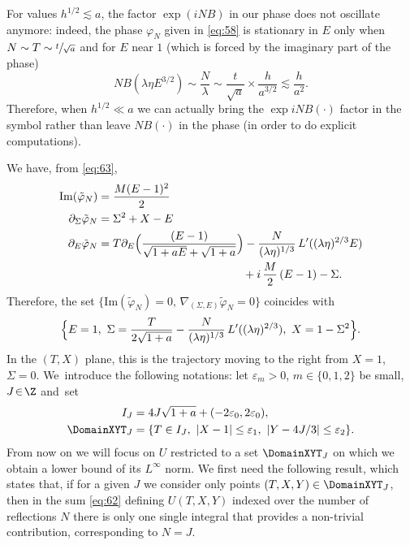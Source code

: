 \begin{rmq}\label{rmqBNB}
For values $h^{1/2}\lesssim a$, the factor $\exp{(iNB)}$ in our phase does not oscillate anymore: indeed, the phase $\varphi_N$ given in \eqref{eq:58} is stationary in $E$ only when $N\sim T\sim \sfrac{t}{\sqrt{a}}$ and for $E$ near $1$ (which is forced by the imaginary part of the phase)
\[
NB(\lambda\eta E^{3/2})\sim \frac{N}{\lambda}\sim \frac{t}{\sqrt{a}}\times \frac{h}{a^{3/2}}\lesssim \frac{h}{a^2}.
\]
Therefore, when $h^{1/2} \ll a$ we can actually bring the $\exp{iNB(\cdot)}$ factor in the symbol rather than leave $NB(\cdot)$ in the phase (in order to do explicit computations).
\end{rmq}
We have, from \eqref{eq:63},
\begin{align*}
\mathrm{Im} (\tilde \varphi_{N})&= \frac{M(E-1)^{2}}{2}\\
\partial_{\Sigma} \tilde \varphi_{N}&=\Sigma^{2}+X-E\\
\partial_{E} \tilde \varphi_{N}&= T\partial_{E}\Bigl(\frac{(E-1)}{ \sqrt{1+aE}+\sqrt{1+a}}\Bigr) - \frac N {(\lambda \eta)^{1/3}}\, L'((\lambda \eta)^{2/3} E)\\
&\hspace*{4.5cm}{}+i\,\frac M 2 \,(E-1)-\Sigma.\notag
\end{align*}
Therefore, the set $\{\mathrm{Im}(\tilde \varphi_{N})=0,\, \nabla_{(\Sigma,E)}\tilde \varphi_{N}=0\}$ coincides with\begin{equation*}
\label{eq:59}
\Bigl\{ E=1,\,\, \Sigma=\frac{T}{2\sqrt {1+a}} - \frac N {(\lambda \eta)^{1/3}}\, L'((\lambda \eta)^{2/3}),\,\,X=1-\Sigma^{2}\Bigr\}.
\end{equation*}
In the $(T,X)$ plane, this is the trajectory moving to the right from $X=1$, $\Sigma=0$. We~introduce the following notations: let $\varepsilon_m\!>\!0$, $m\!\in\!\{0,1,2\}$ be small, $J\!\in\!\Z$ and~set
\begin{align*}
I_{J}&=4J \sqrt{1+a}+(-2\varepsilon_{0},2\varepsilon_{0}),
\\
\DomainXYT_{J}&=\{T\in I_{J},\,\, |X-1|\leq \varepsilon_{1},\,\, |Y-4 J/3|\leq \varepsilon_{2}\}.
\end{align*}
From now on we will focus on $U$ restricted to a set $\DomainXYT_J$ on which we obtain a lower bound of its $L^{\infty}$ norm. We first need the following result, which states that, if for a given $J$ we consider only points $(T,X,Y)\in \DomainXYT_J$, then in the sum \eqref{eq:62} defining $U(T,X,Y)$ indexed over the number of reflections $N$ there is only one single integral that provides a non-trivial contribution, corresponding to $N=J$.
